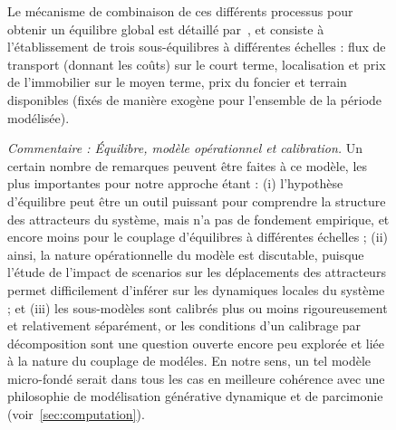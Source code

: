 \begin{figure}
\begin{mdframed}
	Le mécanisme de combinaison de ces différents processus pour obtenir un équilibre global est détaillé par~\cite{kryvobokov2013comparison}, et consiste à l'établissement de trois sous-équilibres à différentes échelles : flux de transport (donnant les coûts) sur le court terme, localisation et prix de l'immobilier sur le moyen terme, prix du foncier et terrain disponibles (fixés de manière exogène pour l'ensemble de la période modélisée).
	
	\bigskip
	
	\textit{Commentaire : Équilibre, modèle opérationnel et calibration.} Un certain nombre de remarques peuvent être faites à ce modèle, les plus importantes pour notre approche étant : (i) l'hypothèse d'équilibre peut être un outil puissant pour comprendre la structure des attracteurs du système, mais n'a pas de fondement empirique, et encore moins pour le couplage d'équilibres à différentes échelles ; (ii) ainsi, la nature opérationnelle du modèle est discutable, puisque l'étude de l'impact de scenarios sur les déplacements des attracteurs permet difficilement d'inférer sur les dynamiques locales du système ; et (iii) les sous-modèles sont calibrés plus ou moins rigoureusement et relativement séparément, or les conditions d'un calibrage par décomposition sont une question ouverte encore peu explorée et liée à la nature du couplage de modéles. En notre sens, un tel modèle micro-fondé serait dans tous les cas en meilleure cohérence avec une philosophie de modélisation générative dynamique et de parcimonie (voir~\ref{sec:computation}).
	
	\medskip
	
	
	\end{mdframed}
\end{figure}

	
	
